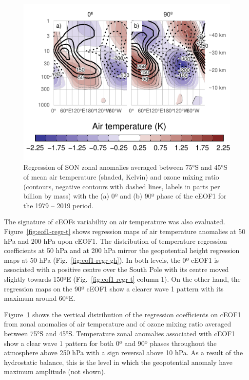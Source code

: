 \documentclass[pdflatex,sn-basic]{sn-jnl}
\theoremstyle{thmstyleone}%
\theoremstyle{thmstyletwo}%
\theoremstyle{thmstylethree}%
\begin{document}
\begin{figure}
\centering
\includegraphics{../figures/t-vertical-1.pdf}
\caption{\label{fig:t-vertical}Regression of SON zonal anomalies averaged between 75°S and 45°S of mean air temperature (shaded, Kelvin) and ozone mixing ratio (contours, negative contours with dashed lines, labels in parts per billion by mass) with the (a) 0º and (b) 90º phase of the cEOF1 for the 1979 -- 2019 period.}
\end{figure}

The signature of cEOFs variability on air temperature was also evaluated.
Figure~\ref{fig:eof1-regr-t} shows regression maps of air temperature anomalies at 50 hPa and 200 hPa upon cEOF1.
The distribution of temperature regression coefficients at 50 hPa and at 200 hPa mirror the geopotential height regression maps at 50 hPa (Fig.~\ref{fig:eof1-regr-gh}).
In both levels, the 0º cEOF1 is associated with a positive centre over the South Pole with its centre moved slightly towards 150ºE (Fig.~\ref{fig:eof1-regr-t} column 1).
On the other hand, the regression maps on the 90º cEOF1 show a clearer wave 1 pattern with its maximum around 60ºE.

Figure~\ref{fig:t-vertical} shows the vertical distribution of the regression coefficients on cEOF1 from zonal anomalies of air temperature and of ozone mixing ratio averaged between 75°S and 45°S.
Temperature zonal anomalies associated with cEOF1 show a clear wave 1 pattern for both 0º and 90º phases throughout the atmosphere above 250 hPa with a sign reversal above 10 hPa.
As a result of the hydrostatic balance, this is the level in which the geopotential anomaly have maximum amplitude (not shown).
\end{document}
